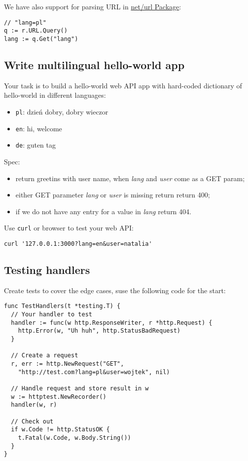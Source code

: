 \documentclass[11pt, letterpaper]{article}
\begin{document}
We have also support for parsing {\small URL} in \href{https://golang.org/pkg/net/url/}{net/url Package}:

\begin{verbatim}
// "lang=pl"
q := r.URL.Query()
lang := q.Get("lang")
\end{verbatim}

\subsection{Write multilingual hello-world app}

Your task is to build a hello-world web {\small API} app with hard-coded dictionary of hello-world in different languages: \begin{itemize}
\item \verb|pl|: dzień dobry, dobry wieczor
\item \verb|en|: hi, welcome
\item \verb|de|: guten tag
\end{itemize}

Spec:
\begin{itemize}
\item return greetins with user name, when \emph{lang} and \emph{user} come as a {\small GET} param;
\item either {\small GET} parameter \emph{lang} or \emph{user} is missing return return 400;
\item if we do not have any entry for a value in \emph{lang} return 404.
\end{itemize}

Use \verb|curl| or browser to test your web {\small API}:\begin{verbatim}
curl '127.0.0.1:3000?lang=en&user=natalia'
\end{verbatim}

\subsection{Testing handlers}

Create tests to cover the edge cases, suse the following code for the start:

\begin{verbatim}
func TestHandlers(t *testing.T) {
  // Your handler to test
  handler := func(w http.ResponseWriter, r *http.Request) {
    http.Error(w, "Uh huh", http.StatusBadRequest)
  }

  // Create a request
  r, err := http.NewRequest("GET",
    "http://test.com?lang=pl&user=wojtek", nil)

  // Handle request and store result in w
  w := httptest.NewRecorder()
  handler(w, r)

  // Check out
  if w.Code != http.StatusOK {
    t.Fatal(w.Code, w.Body.String())
  }
}
\end{verbatim}
\end{document}
